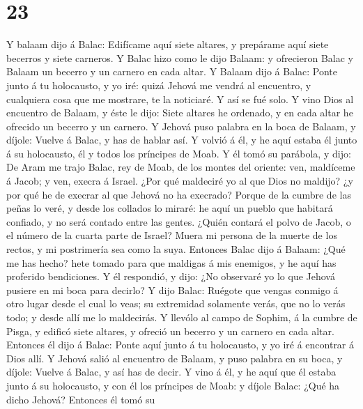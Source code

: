 \hypertarget{section-22}{%
\section{23}\label{section-22}}

 Y balaam dijo á Balac: Edifícame aquí siete altares, y
prepárame aquí siete becerros y siete carneros.  Y Balac
hizo como le dijo Balaam: y ofrecieron Balac y Balaam un becerro y un
carnero en cada altar.  Y Balaam dijo á Balac: Ponte junto á
tu holocausto, y yo iré: quizá Jehová me vendrá al encuentro, y
cualquiera cosa que me mostrare, te la noticiaré. Y así se fué solo.
 Y vino Dios al encuentro de Balaam, y éste le dijo: Siete
altares he ordenado, y en cada altar he ofrecido un becerro y un
carnero.  Y Jehová puso palabra en la boca de Balaam, y
díjole: Vuelve á Balac, y has de hablar así.  Y volvió á él,
y he aquí estaba él junto á su holocausto, él y todos los príncipes de
Moab.  Y él tomó su parábola, y dijo: De Aram me trajo
Balac, rey de Moab, de los montes del oriente: ven, maldíceme á Jacob; y
ven, execra á Israel.  ¿Por qué maldeciré yo al que Dios no
maldijo? ¿y por qué he de execrar al que Jehová no ha execrado?
 Porque de la cumbre de las peñas lo veré, y desde los
collados lo miraré: he aquí un pueblo que habitará confiado, y no será
contado entre las gentes.  ¿Quién contará el polvo de
Jacob, o el número de la cuarta parte de Israel? Muera mi persona de la
muerte de los rectos, y mi postrimería sea como la suya. 
Entonces Balac dijo á Balaam: ¿Qué me has hecho? hete tomado para que
maldigas á mis enemigos, y he aquí has proferido bendiciones.
 Y él respondió, y dijo: ¿No observaré yo lo que Jehová
pusiere en mi boca para decirlo?  Y dijo Balac: Ruégote que
vengas conmigo á otro lugar desde el cual lo veas; su extremidad
solamente verás, que no lo verás todo; y desde allí me lo maldecirás.
 Y llevólo al campo de Sophim, á la cumbre de Pisga, y
edificó siete altares, y ofreció un becerro y un carnero en cada altar.
 Entonces él dijo á Balac: Ponte aquí junto á tu
holocausto, y yo iré á encontrar á Dios allí.  Y Jehová
salió al encuentro de Balaam, y puso palabra en su boca, y díjole:
Vuelve á Balac, y así has de decir.  Y vino á él, y he aquí
que él estaba junto á su holocausto, y con él los príncipes de Moab: y
díjole Balac: ¿Qué ha dicho Jehová?  Entonces él tomó su
